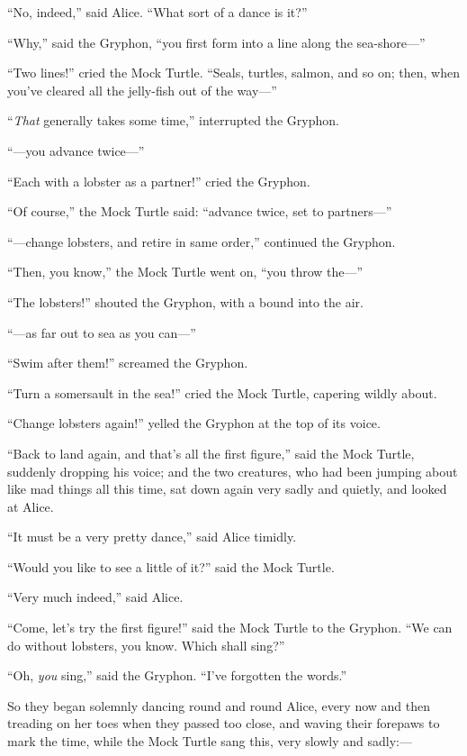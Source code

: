\documentclass[book, 20pt]{extbook}
\begin{document}
``No, indeed,'' said Alice. ``What sort of a dance is it?''

``Why,'' said the Gryphon, ``you first form into a line along the
sea-shore---''

``Two lines!'' cried the Mock Turtle. ``Seals, turtles, salmon, and so
on; then, when you've cleared all the jelly-fish out of the way---''

``\emph{That} generally takes some time,'' interrupted the Gryphon.

``---you advance twice---''

``Each with a lobster as a partner!'' cried the Gryphon.

``Of course,'' the Mock Turtle said: ``advance twice, set to
partners---''

``---change lobsters, and retire in same order,'' continued the Gryphon.

``Then, you know,'' the Mock Turtle went on, ``you throw the---''

``The lobsters!'' shouted the Gryphon, with a bound into the air.

``---as far out to sea as you can---''

``Swim after them!'' screamed the Gryphon.

``Turn a somersault in the sea!'' cried the Mock Turtle, capering wildly
about.

``Change lobsters again!'' yelled the Gryphon at the top of its voice.

``Back to land again, and that's all the first figure,'' said the Mock
Turtle, suddenly dropping his voice; and the two creatures, who had been
jumping about like mad things all this time, sat down again very sadly
and quietly, and looked at Alice.

``It must be a very pretty dance,'' said Alice timidly.

``Would you like to see a little of it?'' said the Mock Turtle.

``Very much indeed,'' said Alice.

``Come, let's try the first figure!'' said the Mock Turtle to the
Gryphon. ``We can do without lobsters, you know. Which shall sing?''

``Oh, \emph{you} sing,'' said the Gryphon. ``I've forgotten the words.''

So they began solemnly dancing round and round Alice, every now and then
treading on her toes when they passed too close, and waving their
forepaws to mark the time, while the Mock Turtle sang this, very slowly
and sadly:---
\end{document}
